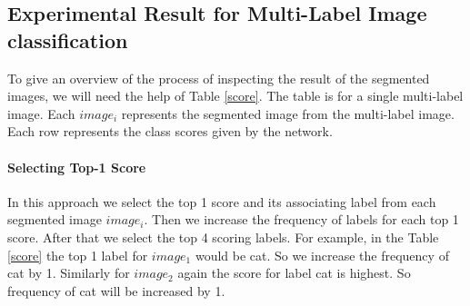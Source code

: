 \subsection{Experimental Result for Multi-Label Image classification}
To give an overview of the process of inspecting the result of the segmented images, we will need the help of Table \ref{score}. The table is for a single multi-label image. Each $image_{i}$ represents the segmented image from the multi-label image. Each row represents the class scores given by the network. 

\paragraph{Selecting Top-1 Score}
In this approach we select the top 1 score and its associating label from each segmented image $image_{i}$. Then we increase the frequency of labels for each top 1 score. After that we select the top 4 scoring labels. For example, in the Table \ref{score} the top 1 label for $image_{1}$ would be cat. So we increase the frequency of cat by 1. Similarly for $image_{2}$ again the score for label cat is highest. So frequency of cat will be increased by 1.



